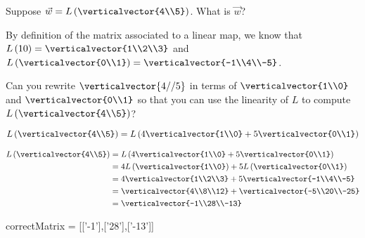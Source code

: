 \documentclass{ximera}
\begin{document}
\begin{question}
  Suppose $\vec{w} = L\left(\verticalvector{4\\5}\right)$.  What is $\vec{w}$?
    
  \begin{solution}
  	\begin{hint}
  		By definition of the matrix associated to a linear map, we know that $L\left(1\\0\right) = \verticalvector{1\\2\\3}$
  		and $L\left(\verticalvector{0\\1}\right) = \verticalvector{-1\\4\\-5}$.
  	\end{hint}
  	\begin{hint}
  		Can you rewrite $\verticalvector{4//5}$ in terms of $\verticalvector{1\\0}$ and $\verticalvector{0\\1}$ so that you can use the linearity
  		of $L$ to compute $L\left(\verticalvector{4\\5}\right)$?
  	\end{hint}
  	\begin{hint}
  		$L\left(\verticalvector{4\\5}\right) = L\left(4\verticalvector{1\\0}+5\verticalvector{0\\1}\right)$
  	\end{hint}
  	\begin{hint}
  		\begin{align*}
  		L\left(\verticalvector{4\\5}\right) &= L\left(4\verticalvector{1\\0}+5\verticalvector{0\\1}\right)\\
  		&= 4L\left(\verticalvector{1\\0}\right)+5L\left(\verticalvector{0\\1}\right)\\
  		&=4\verticalvector{1\\2\\3}+5\verticalvector{-1\\4\\-5}\\
  		&=\verticalvector{4\\8\\12}+\verticalvector{-5\\20\\-25}\\
  		&=\verticalvector{-1\\28\\-13}
  		\end{align*}
  	\end{hint}
    \begin{matrix-answer}[name=w]
      correctMatrix = [['-1'],['28'],['-13']]
    \end{matrix-answer}          
  \end{solution}
  

\end{question}
\end{document}
